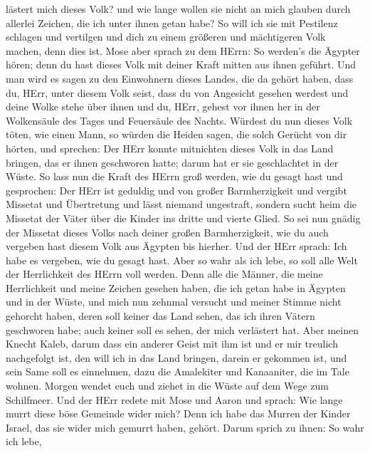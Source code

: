 lästert mich dieses Volk? und wie lange wollen sie nicht an mich glauben
durch allerlei Zeichen, die ich unter ihnen getan habe?  So
will ich sie mit Pestilenz schlagen und vertilgen und dich zu einem
größeren und mächtigeren Volk machen, denn dies ist.  Mose
aber sprach zu dem HErrn: So werden's die Ägypter hören; denn du hast
dieses Volk mit deiner Kraft mitten aus ihnen geführt.  Und
man wird es sagen zu den Einwohnern dieses Landes, die da gehört haben,
dass du, HErr, unter diesem Volk seist, dass du von Angesicht gesehen
werdest und deine Wolke stehe über ihnen und du, HErr, gehest vor ihnen
her in der Wolkensäule des Tages und Feuersäule des Nachts.
 Würdest du nun dieses Volk töten, wie einen Mann, so
würden die Heiden sagen, die solch Gerücht von dir hörten, und sprechen:
 Der HErr konnte mitnichten dieses Volk in das Land
bringen, das er ihnen geschworen hatte; darum hat er sie geschlachtet in
der Wüste.  So lass nun die Kraft des HErrn groß werden,
wie du gesagt hast und gesprochen:  Der HErr ist geduldig
und von großer Barmherzigkeit und vergibt Missetat und Übertretung und
lässt niemand ungestraft, sondern sucht heim die Missetat der Väter über
die Kinder ins dritte und vierte Glied.  So sei nun gnädig
der Missetat dieses Volks nach deiner großen Barmherzigkeit, wie du auch
vergeben hast diesem Volk aus Ägypten bis hierher.  Und der
HErr sprach: Ich habe es vergeben, wie du gesagt hast. 
Aber so wahr als ich lebe, so soll alle Welt der Herrlichkeit des HErrn
voll werden.  Denn alle die Männer, die meine Herrlichkeit
und meine Zeichen gesehen haben, die ich getan habe in Ägypten und in
der Wüste, und mich nun zehnmal versucht und meiner Stimme nicht
gehorcht haben,  deren soll keiner das Land sehen, das ich
ihren Vätern geschworen habe; auch keiner soll es sehen, der mich
verlästert hat.  Aber meinen Knecht Kaleb, darum dass ein
anderer Geist mit ihm ist und er mir treulich nachgefolgt ist, den will
ich in das Land bringen, darein er gekommen ist, und sein Same soll es
einnehmen,  dazu die Amalekiter und Kanaaniter, die im Tale
wohnen. Morgen wendet euch und ziehet in die Wüste auf dem Wege zum
Schilfmeer.  Und der HErr redete mit Mose und Aaron und
sprach:  Wie lange murrt diese böse Gemeinde wider mich?
Denn ich habe das Murren der Kinder Israel, das sie wider mich gemurrt
haben, gehört.  Darum sprich zu ihnen: So wahr ich lebe,
